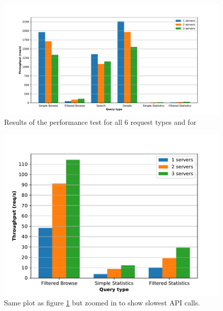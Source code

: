 \documentclass[11pt]{article}
\begin{document}
\begin{figure}[]
	\centering
	\includegraphics[width=\textwidth]{figs/siege_barplot_all.pdf}
	\caption{Results of the performance test for all 6 request types and for }
	\label{fig:barplot_all}
\end{figure}
\begin{figure}[]
	\centering
	\includegraphics[width=\textwidth]{figs/siege_barplot_slow.pdf}
	\caption{Same plot as figure \ref{fig:barplot_all} but zoomed in to show slowest API calls.}
	\label{fig:barplot_slow}
\end{figure}
\end{document}
